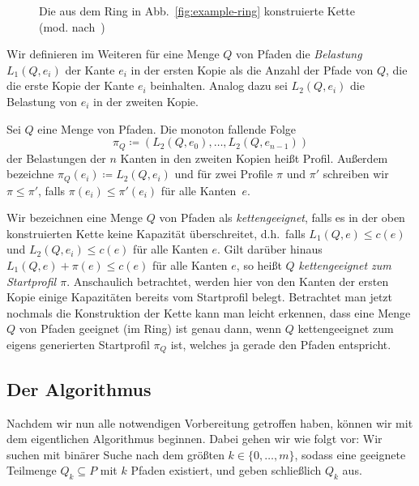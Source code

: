 \begin{figure}[htbp]
    \centering
    \def\svgwidth{270bp}
    
    \caption{Die aus dem Ring in Abb.~\ref{fig:example-ring} konstruierte Kette (mod. nach~\cite{paper})}
    \label{fig:example-ring-to-chain}
\end{figure}

Wir definieren im Weiteren für eine Menge $Q$ von Pfaden die {\em Belastung} $L_1(Q, e_i)$ der Kante
$e_i$ in der ersten Kopie als die Anzahl der Pfade von $Q$, die die erste Kopie der Kante $e_i$ beinhalten.
Analog dazu sei $L_2(Q, e_i)$ die Belastung von $e_i$ in der zweiten Kopie.
\begin{definition}[Profil]
    Sei $Q$ eine Menge von Pfaden.
    Die  monoton fallende Folge
    \[\pi_{Q}\coloneqq  (L_2(Q, e_0), \dots, L_2(Q, e_{n-1}))\]
    der Belastungen der $n$ Kanten in den zweiten Kopien heißt Profil.
    Außerdem bezeichne $\pi_Q(e_i) \coloneqq L_2(Q, e_i)$ und für zwei Profile $\pi$ und $\pi'$ schreiben wir $\pi \leq \pi'$,
    falls $\pi(e_i) \leq \pi'(e_i)$ für alle Kanten~$e$.
\end{definition}
Wir bezeichnen eine Menge $Q$ von Pfaden als {\em kettengeeignet},
falls es in der oben konstruierten Kette keine Kapazität überschreitet, d.h.\ falls $L_1(Q, e) \leq c(e)$ und
$L_2(Q, e_i) \leq c(e)$ für alle Kanten $e$.
Gilt darüber hinaus $L_1(Q, e) + \pi(e) \leq c(e)$ für alle Kanten $e$, so heißt $Q$ {\em kettengeeignet zum Startprofil $\pi$}.
Anschaulich betrachtet, werden hier von den Kanten der ersten Kopie einige Kapazitäten bereits vom Startprofil belegt.
Betrachtet man jetzt nochmals die Konstruktion der Kette kann man leicht erkennen, dass eine Menge $Q$ von Pfaden geeignet
(im Ring) ist genau dann, wenn $Q$ kettengeeignet zum eigens generierten Startprofil $\pi_Q$ ist, welches ja gerade den
 Pfaden entspricht.


\subsection{Der Algorithmus}

Nachdem wir nun alle notwendigen Vorbereitung getroffen haben, können wir mit dem eigentlichen Algorithmus beginnen.
Dabei gehen wir wie folgt vor:
Wir suchen mit binärer Suche nach dem größten $k \in \{0, \dots, m\}$, sodass eine geeignete Teilmenge $Q_k \subseteq P$
mit $k$ Pfaden existiert, und geben schließlich $Q_k$ aus.


